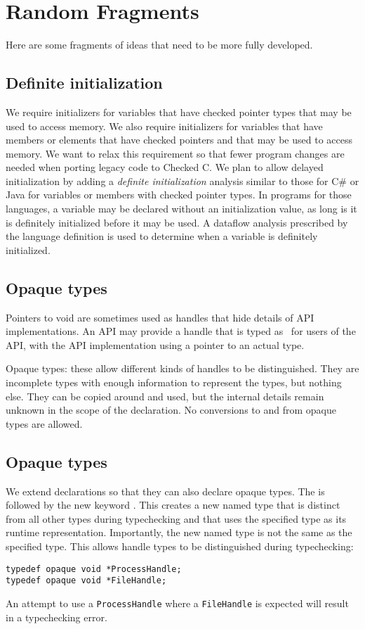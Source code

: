 

\chapter{Random Fragments}

Here are some fragments of ideas that need to be more fully developed.

\section{Definite initialization}

We require initializers for variables that have checked pointer types that may
be used to access memory.  We also require initializers for variables that have members
or elements that have checked pointers and that may be used to access memory.
We want to relax this requirement so that fewer program changes are needed when 
porting legacy code to Checked C.  We plan to allow delayed initialization by adding a
{\em definite initialization} analysis
similar to those for C\# or Java for variables or members with checked pointer types.
In programs for those languages, a variable may be declared without an initialization value, as
long is it is definitely initialized before it may be used.  A dataflow analysis prescribed by the
language definition is used to determine when a variable is definitely initialized.

\section{Opaque types}

Pointers to void are sometimes used as handles that hide details of API implementations.  An
API may provide a handle that is typed as \uncheckedptrvoid\ for 
users of the API, with the API implementation using a pointer to an actual
type.

Opaque types: these allow different kinds of handles to be distinguished.
They are incomplete types with enough information to represent
the types, but nothing else.  They can be copied around and used, but the internal
details remain unknown in the scope of the declaration.  No conversions to and 
from opaque types are allowed.

\section{Opaque types}

We extend  declarations so that they can also declare opaque types. 
The  is followed by the new keyword .
This creates a new named type that is distinct from all other types during
typechecking and that uses the specified type as its runtime representation.
Importantly, the new named type is not the same as the specified type.  This allows
handle types to be distinguished during typechecking:
\begin{lstlisting}
typedef opaque void *ProcessHandle;
typedef opaque void *FileHandle;
\end{lstlisting}
An attempt to use a \lstinline+ProcessHandle+ where a \lstinline+FileHandle+ 
is expected will result in a typechecking error.

